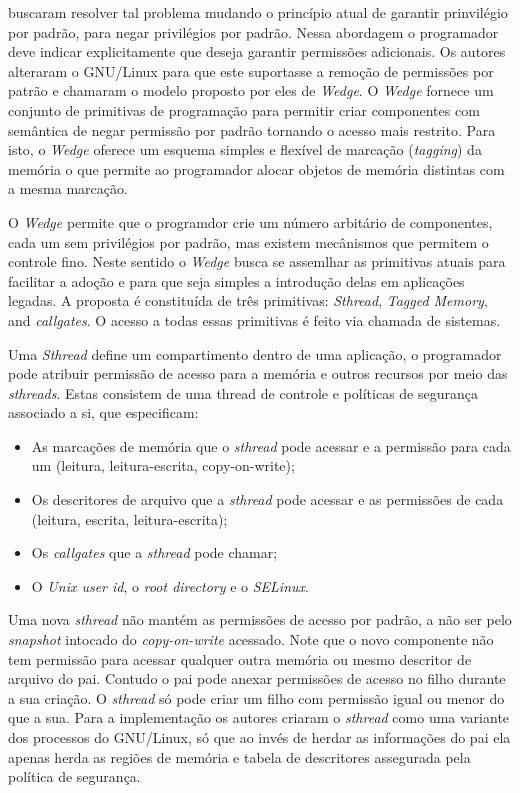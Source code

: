 \cite{wedge} buscaram resolver tal problema mudando o princípio atual de
garantir prinvilégio por padrão, para negar privilégios por padrão. Nessa
abordagem o programador deve indicar explicitamente que deseja garantir
permissões adicionais. Os autores alteraram o GNU/Linux para que este
suportasse a remoção de permissões por patrão e chamaram o modelo proposto por
eles de \emph{Wedge}. O \emph{Wedge} fornece um conjunto de primitivas de
programação para permitir criar componentes com semântica de negar permissão
por padrão tornando o acesso mais restrito. Para isto, o \emph{Wedge} oferece
um esquema simples e flexível de marcação (\emph{tagging}) da memória o que
permite ao programador alocar objetos de memória distintas com a mesma
marcação.

O \emph{Wedge} permite que o programdor crie um número arbitário de
componentes, cada um sem privilégios por padrão, mas existem mecânismos que
permitem o controle fino. Neste sentido o \emph{Wedge} busca se assemlhar as
primitivas atuais para facilitar a adoção e para que seja simples a introdução
delas em aplicações legadas. A proposta é constituída de três primitivas:
\emph{Sthread}, \emph{Tagged Memory}, and \emph{callgates}. O acesso a todas
essas primitivas é feito via chamada de sistemas.

Uma \emph{Sthread} define um compartimento dentro de uma aplicação, o
programador pode atribuir permissão de acesso para a memória e outros recursos
por meio das \emph{sthreads}. Estas consistem de uma thread de controle e
políticas de segurança associado a si, que especificam:

\begin{itemize}
	\item As marcações de memória que o \emph{sthread} pode acessar e a permissão
				para cada um (leitura, leitura-escrita, copy-on-write);
	\item Os descritores de arquivo que a \emph{sthread} pode acessar e as
				permissões de cada (leitura, escrita, leitura-escrita);
	\item Os \emph{callgates} que a \emph{sthread} pode chamar;
	\item O \emph{Unix user id}, o \emph{root directory} e o \emph{SELinux}.
\end{itemize}

Uma nova \emph{sthread} não mantém as permissões de acesso por padrão, a não
ser pelo \emph{snapshot} intocado do \emph{copy-on-write} acessado. Note que o
novo componente não tem permissão para acessar qualquer outra memória ou mesmo
descritor de arquivo do pai. Contudo o pai pode anexar permissões de acesso no
filho durante a sua criação. O \emph{sthread} só pode criar um filho com
permissão igual ou menor do que a sua. Para a implementação os autores criaram
o \emph{sthread} como uma variante dos processos do GNU/Linux, só que ao invés
de herdar as informações do pai ela apenas herda as regiões de memória e tabela
de descritores assegurada pela política de segurança.

